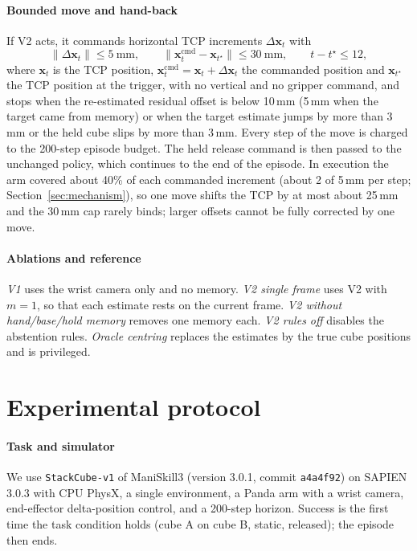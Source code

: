 \documentclass[preprint,12pt]{elsarticle}
\begin{document}
\paragraph{Bounded move and hand-back} If V2 acts, it commands horizontal TCP increments $\Delta\mathbf{x}_t$ with
\begin{equation}
\|\Delta\mathbf{x}_t\|\le 5\ \mathrm{mm},\qquad \|\mathbf{x}^{\mathrm{cmd}}_t-\mathbf{x}_{t^\star}\|\le 30\ \mathrm{mm},\qquad t-t^\star\le 12,
\end{equation}
where $\mathbf{x}_t$ is the TCP position, $\mathbf{x}^{\mathrm{cmd}}_t=\mathbf{x}_t+\Delta\mathbf{x}_t$ the commanded position and $\mathbf{x}_{t^\star}$ the TCP position at the trigger, with no vertical and no gripper command, and stops when the re-estimated residual offset is below 10\,mm (5\,mm when the target came from memory) or when the target estimate jumps by more than 3\,mm or the held cube slips by more than 3\,mm. Every step of the move is charged to the 200-step episode budget. The held release command is then passed to the unchanged policy, which continues to the end of the episode. In execution the arm covered about 40\% of each commanded increment (about 2 of 5\,mm per step; Section~\ref{sec:mechanism}), so one move shifts the TCP by at most about 25\,mm and the 30\,mm cap rarely binds; larger offsets cannot be fully corrected by one move.

\paragraph{Ablations and reference} \emph{V1} uses the wrist camera only and no memory. \emph{V2 single frame} uses V2 with $m=1$, so that each estimate rests on the current frame. \emph{V2 without hand/base/hold memory} removes one memory each. \emph{V2 rules off} disables the abstention rules. \emph{Oracle centring} replaces the estimates by the true cube positions and is privileged.

\section{Experimental protocol}\label{sec:protocol}

\paragraph{Task and simulator} We use \texttt{StackCube-v1} of ManiSkill3 \cite{tao2024maniskill3} (version 3.0.1, commit \texttt{a4a4f92}) on SAPIEN 3.0.3 \cite{xiang2020sapien} with CPU PhysX, a single environment, a Panda arm with a wrist camera, end-effector delta-position control, and a 200-step horizon. Success is the first time the task condition holds (cube A on cube B, static, released); the episode then ends.
\end{document}
